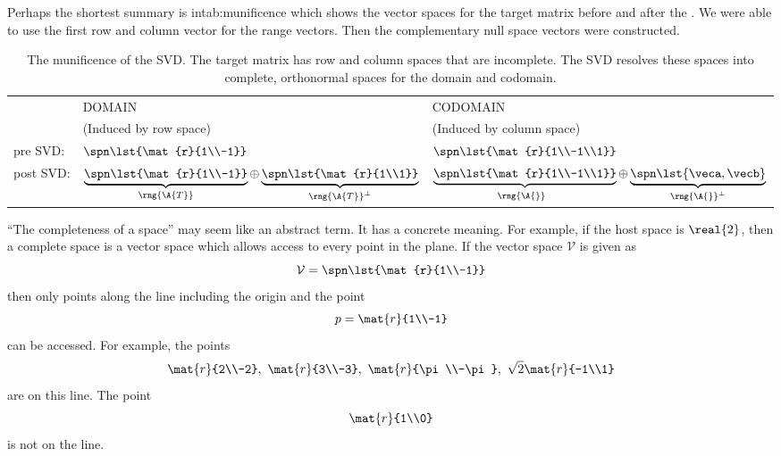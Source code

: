 Perhaps the shortest summary is in{tab:munificence} which shows the vector spaces for the target matrix before and after the \svdl. We were able to use the first row and column vector for the range vectors. Then the complementary null space vectors were constructed.
\begin{table}[htdp]
\begin{center}
\begin{tabular}{lll}
 & DOMAIN & CODOMAIN \\
 & (Induced by row space) & (Induced by column space) \\\hline\hline
 pre SVD: & $\spn \lst{\mat{r}{1\\-1}}$ & $\spn \lst{\mat{r}{1\\-1\\1}}$ \phantom{$\mat{c}{1\\1\\1\\1}$}\\[5pt]\hline
 post SVD:  & $\underbrace{\spn \lst{\mat{r}{1\\-1}}}_{\rng{\A{T}}} \oplus \underbrace{\spn \lst{\mat{r}{1\\1}}}_{\rng{\A{T}}^{\perp}}$ & $\underbrace{\spn \lst{\mat{r}{1\\-1\\1}}}_{\rng{\A{}}^{\phantom{T}}} \oplus \underbrace{\spn \lst{\veca,\vecb}}_{\rng{\A{}}^{\perp}}$ \\[35pt]\hline
\end{tabular}
\end{center}
\label{tab:munificence}
\caption[The SVD resolves the fundamental subspaces]{The munificence of the SVD. The target matrix has row and column spaces that are incomplete. The SVD resolves these spaces into complete, orthonormal spaces for the domain and codomain.}
\end{table}

``The completeness of a space'' may seem like an abstract term. It has a concrete meaning. For example, if the host space is $\real{2}$, then a complete space is a vector space which allows access to every point in the plane. If the vector space $\mathcal{V}$ is given as
\begin{equation}
\mathcal{V} = \spn \lst{\mat{r}{1\\-1}}
\end{equation}
then only points along the line including the origin and the point 
\begin{equation}
p=\mat{r}{1\\-1}
\end{equation}
can be accessed. For example, the points 
$$
\mat{r}{2\\-2},\ \mat{r}{3\\-3},\ \mat{r}{\pi\\-\pi},\ \sqrt{2}\mat{r}{-1\\1}
$$
are on this line. The point 
\begin{equation*}
  \mat{r}{1\\0}
\end{equation*}
is not on the line.

